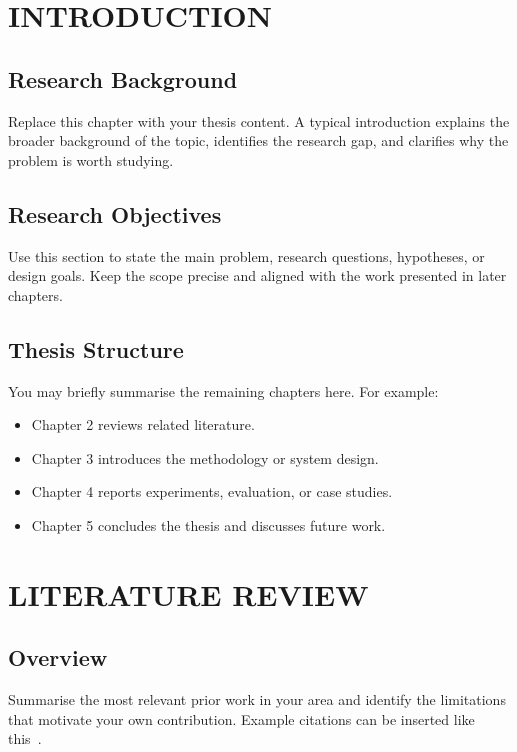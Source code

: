 \chapter{INTRODUCTION}

\section{Research Background}

Replace this chapter with your thesis content. A typical introduction explains the broader background of the topic, identifies the research gap, and clarifies why the problem is worth studying.

\section{Research Objectives}

Use this section to state the main problem, research questions, hypotheses, or design goals. Keep the scope precise and aligned with the work presented in later chapters.

\section{Thesis Structure}

You may briefly summarise the remaining chapters here. For example:

\begin{itemize}[nosep]
    \item Chapter 2 reviews related literature.
    \item Chapter 3 introduces the methodology or system design.
    \item Chapter 4 reports experiments, evaluation, or case studies.
    \item Chapter 5 concludes the thesis and discusses future work.
\end{itemize}

\chapter{LITERATURE REVIEW}

\section{Overview}

Summarise the most relevant prior work in your area and identify the limitations that motivate your own contribution. Example citations can be inserted like this~\cite{lamport1994latex,knuth1984texbook}.

